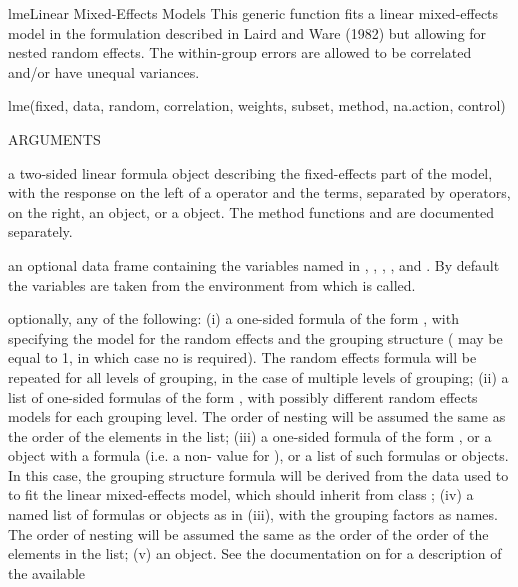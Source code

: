 \documentclass[pdftex]{article} \usepackage{url,graphicx}
\renewcommand{\Twiddle}{\mbox{\(\sim\)}}
\begin{document}
\begin{Helpfile}{lme}{Linear Mixed-Effects Models}
This generic function fits a linear mixed-effects model in the
formulation described in Laird and Ware (1982) but allowing for nested
random effects. The within-group errors are allowed to be correlated
and/or have unequal variances.
\begin{Example}
lme(fixed, data, random, correlation, weights, subset, method,
    na.action, control)
\end{Example}
\begin{Argument}{ARGUMENTS}
\item[\Co{fixed:}]
a two-sided linear formula object describing the
fixed-effects part of the model, with the response on the left of a
\Co{{\Twiddle}} operator and the terms, separated by \Co{+} operators, on
the right, an  object, or a 
object. The method functions  and
 are documented separately.
\item[\Co{data:}]
an optional data frame containing the variables named in
, , , , and
.  By default the variables are taken from the
environment from which  is called.
\item[\Co{random:}]
optionally, any of the following: (i) a one-sided formula
of the form \Co{{\Twiddle}x1+...+xn | g1/.../gm}, with 
specifying the model for the random effects and  the
grouping structure ( may be equal to 1, in which case no
\Co{/} is required). The random effects formula will be repeated
for all levels of grouping, in the case of multiple levels of
grouping; (ii) a list of one-sided formulas of the form
\Co{{\Twiddle}x1+...+xn | g}, with possibly different random effects models
for each grouping level. The order of nesting will be assumed the
same as the order of the elements in the list; (iii) a one-sided
formula of the form \Co{{\Twiddle}x1+...+xn}, or a  object with
a formula (i.e. a non- value for ),
or a list of such formulas or  objects. In this case, the
grouping structure formula will be derived from the data used to to
fit the linear mixed-effects model, which should inherit from class
; (iv) a named list of formulas or 
objects as in (iii), with the grouping factors as names. The order of
nesting will be assumed the same as the order of the order of the
elements in the list; (v) an  object. See the
documentation on  for a description of the available

\end{Argument}
\end{Helpfile}
\end{document}

